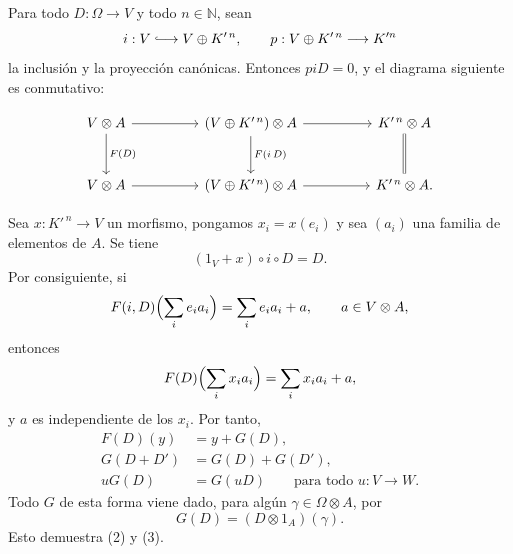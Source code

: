 Para todo $D:\Omega\longrightarrow V$ y todo $n\in\mathbb N$, sean
\[
 i:V\lhook\joinrel\longrightarrow V\oplus K'^{\,n},
 \qquad
 p:V\oplus K'^{\,n}\longrightarrow \sisi{K^{n}}{K'^{n}}
\]
la inclusión y la proyección canónicas. Entonces $piD=0$, y el
diagrama siguiente es conmutativo:


\[
\begin{tikzcd}[column sep=huge,row sep=large]
 V\otimes A
   \arrow[r]
   \arrow[d,"{F(D)}"]
 & (V\oplus K'^{\,n})\otimes A
   \arrow[r]
   \arrow[d,"{\sisi{F(i,D)}{F(i\,D)}}"]
 & K'^{\,n}\otimes A
   \arrow[d,equal]\\
 V\otimes A
   \arrow[r]
 & (V\oplus K'^{\,n})\otimes A
   \arrow[r]
 & K'^{\,n}\otimes A.
\end{tikzcd}
\]

Sea $x:K'^{\,n}\longrightarrow V$ un morfismo, pongamos
$x_i=x(e_i)$ y sea $(a_i)$ una familia de elementos de $A$. Se tiene
\[
 (1_V+x)\circ i\circ D=D.
\]
Por consiguiente, si
\[
 F(i,D)\Bigl(\sum_i e_i a_i\Bigr)
 =\sum_i e_i a_i+a,
 \qquad a\in V\otimes A,
\]
entonces
\[
 F(D)\Bigl(\sum_i x_i a_i\Bigr)
 =\sum_i x_i a_i+a,
\]
y $a$ es independiente de los $x_i$. Por tanto,
\[
\begin{aligned}
 F(D)(y)&=y+G(D),\\
 G(D+D')&=G(D)+G(D'),\\
 uG(D)&=G(uD)
   \qquad\text{para todo }u:V\longrightarrow W.
\end{aligned}
\]
Todo $G$ de esta forma viene dado, para algún
$\gamma\in\Omega\otimes A$, por
\[
 G(D)=(D\otimes1_A)(\gamma).
\]
Esto demuestra (2) y (3).
